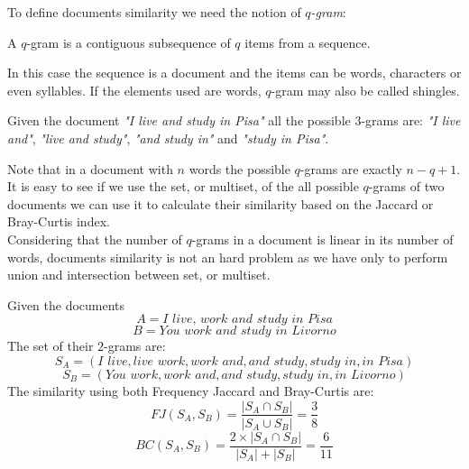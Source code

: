 To define documents similarity we need the notion of \textit{$q$-gram}:

\begin{definizione}
	A $q$-gram is a contiguous subsequence of $q$ items from a sequence.
\end{definizione}

In this case the sequence is a document and the items can be words, characters or even syllables. If the elements used are words, $q$-gram may also be called shingles.

\begin{esempio}
	Given the document \textit{"I live and study in Pisa"} all the possible $3$-grams are: 
	\textit{"I live and"}, \textit{"live and study"}, \textit{"and study in"} and \textit{"study in Pisa"}.
\end{esempio}

Note that in a document with $n$ words the possible $q$-grams are exactly $n-q+1$.\\

It is easy to see if we use the set, or multiset, of the all possible $q$-grams of two documents we can use it to calculate their similarity based on the Jaccard or Bray-Curtis index.\\

Considering that the number of $q$-grams in a document is linear in its number of words, documents similarity is not an hard problem as we have only to perform union and intersection between set, or multiset.\\

\begin{esempio}
	Given the documents 
	\begin{equation*}
	A = \textit{I live, work and study in Pisa}
	\end{equation*}
	\begin{equation*}
	B = \textit{You work and study in Livorno}
	\end{equation*}
	The set of their $2$-grams are:
	\begin{equation*}
	S_{A} = (\textit{I live}, \textit{live work}, \textit{work and}, \textit{and study}, \textit{study in}, \textit{in Pisa})
	\end{equation*}
	\begin{equation*}
	S_{B} = (\textit{You work}, \textit{work and}, \textit{and study}, \textit{study in}, \textit{in Livorno})
	\end{equation*}
	The similarity using both Frequency Jaccard and Bray-Curtis are:\\
	\begin{equation*}
		FJ(S_{A},S_{B}) = \frac{|S_{A} \cap S_{B} |}{|S_{A} \cup S_{B} |} = \frac{3}{8}
	\end{equation*}
	\begin{equation*}
		BC(S_{A},S_{B}) = \frac{2 \times |S_{A} \cap S_{B} |}{|S_{A}| +|S_{B}|} = \frac{6}{11}
	\end{equation*}
\end{esempio}

